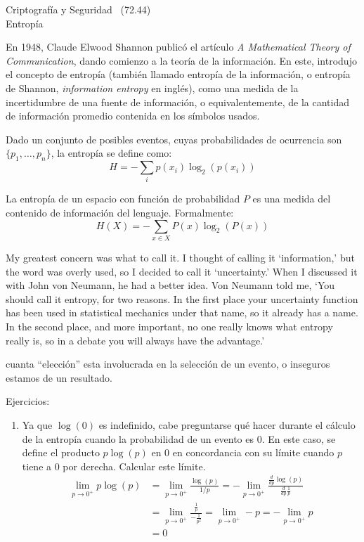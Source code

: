 \documentclass[]{book}
\theoremstyle{definition}
\begin{document}
\begin{center}
  {\Large Criptografía y Seguridad \the\year~(72.44)\\[.2cm]
Entropía}\\
\end{center}

\vspace{0.2 cm}


En 1948, Claude Elwood Shannon publicó el artículo \textit{A Mathematical
Theory of Communication}, dando comienzo a la teoría de la información. En
este, introdujo el concepto de entropía (también llamado entropía de la
información, o entropía de Shannon, \textit{information entropy} en
inglés), como una medida de la incertidumbre de una fuente de información, o
equivalentemente, de la cantidad de información promedio contenida en los
símbolos usados.

Dado un conjunto de posibles eventos, cuyas probabilidades de ocurrencia son $\{p_1,\dots,p_n\}$, la entropía se define como:
\[ H = -\sum_i p(x_i)\log_2(p(x_i))\]

La entropía de un espacio con función de probabilidad $P$ es una medida del
contenido de información del lenguaje. Formalmente:
\[ H(X) = -\sum_{x \in X} P(x)\log_2(P(x)) \]


My greatest concern was what to call it. I thought of calling it `information,'
but the word was overly used, so I decided to call it `uncertainty.' When I
discussed it with John von Neumann, he had a better idea. Von Neumann told me,
`You should call it entropy, for two reasons. In the first place your
uncertainty function has been used in statistical mechanics under that name, so
it already has a name. In the second place, and more important, no one really
knows what entropy really is, so in a debate you will always have the
advantage.' 

cuanta ``elección'' esta involucrada en la
selección de un evento, o inseguros estamos de un resultado.

Ejercicios:
\begin{enumerate}
  \item Ya que $\log(0)$ es indefinido, cabe preguntarse qué hacer durante el
    cálculo de la entropía cuando la probabilidad de un evento es 0. En este
    caso, se define el producto $p\log(p)$ en 0 en concordancia con su límite
    cuando $p$ tiene a $0$ por derecha. Calcular este límite.  \begin{align*}
      \lim_{p\to0^+} p \log(p) &= \lim_{p\to0^+} \frac{\log(p)}{1/p} =
      -\lim_{p\to0^+} \frac{\frac{d}{dp}\log(p)}{\frac{d}{dp}\frac{1}{p}} \\ &=
      \lim_{p\to0^+} \frac{\frac{1}{p}}{-\frac{1}{p^2}} = \lim_{p\to0^+} -p =
      -\lim_{p\to0^+} p\\ &= 0 \end{align*}

\end{enumerate}
\end{document}
